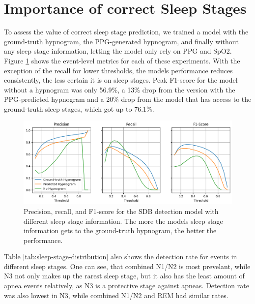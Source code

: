 \section{Importance of correct Sleep Stages}

To assess the value of correct sleep stage prediction, we trained a model with the ground-truth hypnogram, the PPG-generated hypnogram, and finally without any sleep stage information, letting the model only rely on PPG and SpO2. Figure \ref{fig:sleep-stage-importance} shows the event-level metrics for each of these experiments. With the exception of the recall for lower thresholds, the models performance reduces consistently, the less certain it is on sleep stages. Peak F1-score for the model without a hypnogram was only 56.9\%, a 13\% drop from the version with the PPG-predicted hypnogram and a 20\% drop from the model that has access to the ground-truth sleep stages, which got up to 76.1\%.

\begin{figure}
    \centering
    \includegraphics[width=\textwidth]{images/SleepStages}
    \caption{Precision, recall, and F1-score for the SDB detection model with different sleep stage information. The more the models sleep stage information gets to the ground-truth hypnogram, the better the performance.}
    \label{fig:sleep-stage-importance}
\end{figure}

Table \ref{tab:sleep-stage-distribution} also shows the detection rate for events in different sleep stages. One can see, that combined N1/N2 is most prevelant, while N3 not only makes up the rarest sleep stage, but it also has the least amount of apnea events relatively, as N3 is a protective stage against apneas. Detection rate was also lowest in N3, while combined N1/N2 and REM had similar rates.

